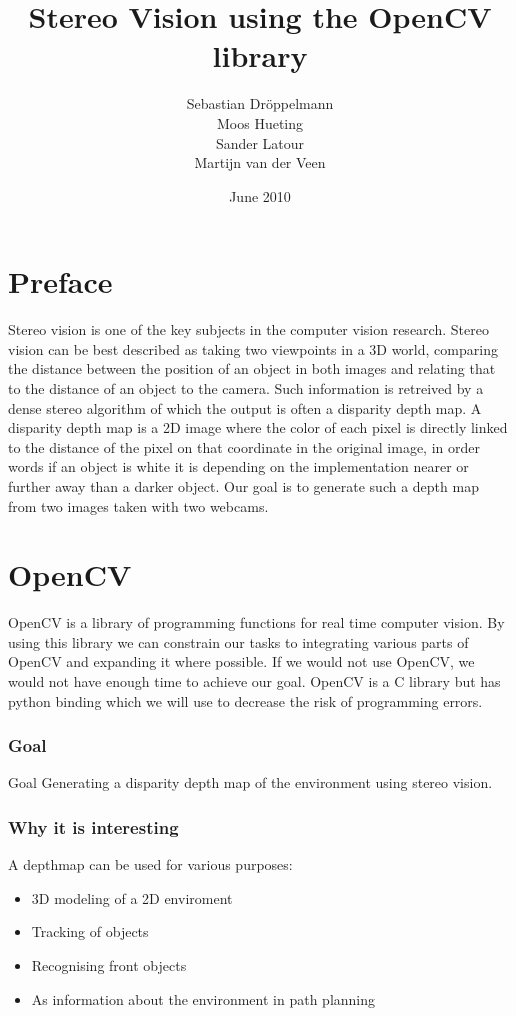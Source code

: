 \documentclass{article}
\begin{document}
\title[Stereo vision]{Stereo Vision using the OpenCV library}
\author[Dr\"oppelmann \and Hueting \and Latour \and \\Van der Veen]{Sebastian Dr\"oppelmann \\ Moos Hueting \\ Sander Latour \\ Martijn van der Veen}
\date{June 2010}

  \titlepage

\section{Preface}
Stereo vision is one of the key subjects in the computer vision research. Stereo vision can be best described as taking two viewpoints in a 3D world, comparing the distance between the position of an object in both images and relating that to the distance of an object to the camera. Such information is retreived by a dense stereo algorithm of which the output is often a disparity depth map. A disparity depth map is a 2D image where the color of each pixel is directly linked to the distance of the pixel on that coordinate in the original image, in order words if an object is white it is depending on the implementation nearer or further away than a darker object. Our goal is to generate such a depth map from two images taken with two webcams.

\section{OpenCV}
OpenCV is a library of programming functions for real time computer vision. By using this library we can constrain our tasks to integrating various parts of OpenCV and expanding it where possible. If we would not use OpenCV, we would not have enough time to achieve our goal. OpenCV is a C library but has python binding which we will use to decrease the risk of programming errors.

 \frametitle{Goal}
 \begin{block}{Goal}
   Generating a disparity depth map of the environment using stereo vision.
 \end{block}

 \frametitle{Why it is interesting}
   A depthmap can be used for various purposes:
   \begin{itemize}
    \item 3D modeling of a 2D enviroment
    \item Tracking of objects
    \item Recognising front objects
    \item As information about the environment in path planning
   \end{itemize}
\end{document}
